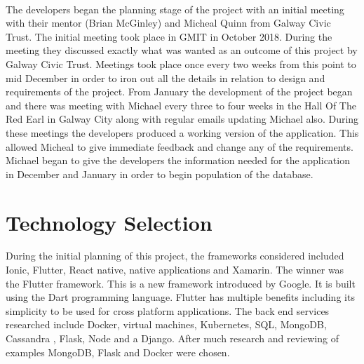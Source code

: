 \paragraph{}The developers began the planning stage of the project with an initial meeting with their mentor (Brian McGinley) and Micheal Quinn from Galway Civic Trust. The initial meeting took place in GMIT in October 2018. During the meeting they discussed exactly what was wanted as an outcome of this project by Galway Civic Trust. Meetings took place once every two weeks from this point to mid December in order to iron out all the details in relation to design and requirements of the project. From January the development of the project began and there was meeting with Michael every three to four weeks in the Hall Of The Red Earl in Galway City along with regular emails updating Michael also. During these meetings the developers produced a working version of the application. This allowed Micheal to give immediate feedback and change any of the requirements. Michael began to give the developers the information needed for the application in December and January in order to begin population of the database.

\section{Technology Selection}
During the initial planning of this project, the frameworks considered included Ionic, Flutter, React native, native applications and Xamarin. The winner was the Flutter framework. This is a new framework introduced by Google. It is built using the Dart programming language. Flutter has multiple benefits including its simplicity to be used for cross platform applications. The back end services researched include Docker, virtual machines, Kubernetes, SQL, MongoDB, Cassandra , Flask, Node and a Django. After much research and reviewing of examples MongoDB, Flask and Docker were chosen.

